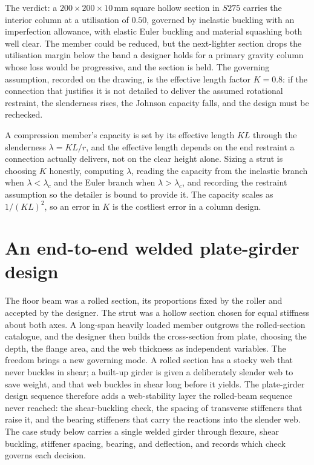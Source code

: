 The verdict: a $200 \times 200 \times 10\,\si{\milli\meter}$ square
hollow section in $S275$ carries the interior column at a utilisation of
$0.50$, governed by inelastic buckling with an imperfection allowance,
with elastic Euler buckling and material squashing both well clear. The
member could be reduced, but the next-lighter section drops the
utilisation margin below the band a designer holds for a primary
gravity column whose loss would be progressive, and the section is held.
The governing assumption, recorded on the drawing, is the effective
length factor $K = 0.8$: if the connection that justifies it is not
detailed to deliver the assumed rotational restraint, the slenderness
rises, the Johnson capacity falls, and the design must be rechecked.

\begin{principle}
A compression member's capacity is set by its effective length $KL$
through the slenderness $\lambda = KL/r$, and the effective length
depends on the end restraint a connection actually delivers, not on the
clear height alone. Sizing a strut is choosing $K$ honestly, computing
$\lambda$, reading the capacity from the inelastic branch when
$\lambda < \lambda_c$ and the Euler branch when $\lambda > \lambda_c$,
and recording the restraint assumption so the detailer is bound to
provide it. The capacity scales as $1/(KL)^2$, so an error in $K$ is the
costliest error in a column design.
\end{principle}

\section{An end-to-end welded plate-girder design}

The floor beam was a rolled section, its proportions fixed by the
roller and accepted by the designer. The strut was a hollow section
chosen for equal stiffness about both axes. A long-span heavily loaded
member outgrows the rolled-section catalogue, and the designer then
builds the cross-section from plate, choosing the depth, the flange
area, and the web thickness as independent variables. The freedom
brings a new governing mode. A rolled section has a stocky web that
never buckles in shear; a built-up girder is given a deliberately slender
web to save weight, and that web buckles in shear long before it yields.
The plate-girder design sequence therefore adds a web-stability layer
the rolled-beam sequence never reached: the shear-buckling check, the
spacing of transverse stiffeners that raise it, and the bearing
stiffeners that carry the reactions into the slender web. The case study
below carries a single welded girder through flexure, shear buckling,
stiffener spacing, bearing, and deflection, and records which check
governs each decision.

